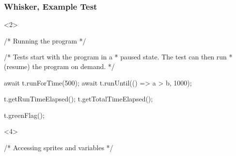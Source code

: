 \begin{frame}[fragile]\frametitle{Whisker, Example Test}
    \vspace{-\bigskipamount}
    \begin{minipage}{.75\textwidth}\end{minipage}%
    \hspace{-.4\textwidth}%
    \begin{onlyenv}<2>
        \begin{minipage}{.6\textwidth}
            \begin{javascriptcode}
                /* Running the program */

                /* Tests start with the program in a
                 * paused state. The test can then run
                 * (resume) the program on demand. */

                await t.runForTime(500);
                await t.runUntil(() => a > b, 1000);

                t.getRunTimeElapsed();
                t.getTotalTimeElapsed();

                t.greenFlag();
            \end{javascriptcode}
        \end{minipage}
    \end{onlyenv}
    \begin{onlyenv}<4>
        \begin{minipage}{.6\textwidth}
            \begin{javascriptcode}
                /* Accessing sprites and variables */


\end{javascriptcode}
\end{minipage}
\end{onlyenv}
\end{frame}
